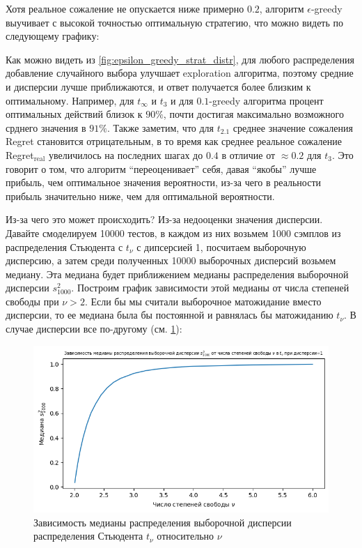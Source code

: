 Хотя реальное сожаление не опускается ниже примерно $0.2$, алгоритм $\epsilon$-greedy выучивает с высокой точностью оптимальную стратегию, что можно видеть по следующему графику: 

Как можно видеть из \ref{fig:epsilon_greedy_strat_distr}, для любого распределения добавление случайного выбора улучшает exploration алгоритма, поэтому средние и дисперсии лучше приближаются, и ответ получается более близким к оптимальному. Например, для $t_{\infty}$ и $t_3$ и для $0.1$-greedy алгоритма процент оптимальных действий близок к $90\%$, почти достигая максимально возможного срднего значения в $91\%$. Также заметим, что для $t_{2.1}$ среднее значение сожаления Regret становится отрицательным, в то время как среднее реальное сожаление Regret$_{{\text{real}}}$ увеличилось на последних шагах до $0.4$ в отличие от $\approx 0.2$ для $t_3$. Это говорит о том, что алгоритм ``переоценивает'' себя, давая ``якобы'' лучше прибыль, чем оптимальное значения вероятности, из-за чего в реальности прибыль значительно ниже, чем для оптимальной вероятности.

Из-за чего это может происходить? Из-за недооценки значения дисперсии. Давайте смоделируем 10000 тестов, в каждом из них возьмем 1000 сэмплов из распределения Стьюдента с $t_{\nu}$ с дипсерсией 1, посчитаем выборочную дисперсию, а затем среди полученных 10000 выборочных дисперсий возьмем медиану. Эта медиана будет приближением медианы распределения выборочной дисперсии $s_{1000}^2$. Построим график зависимости этой медианы от числа степеней свободы при $\nu > 2$. Если бы мы считали выборочное матожидание вместо дисперсии, то ее медиана была бы постоянной и равнялась бы матожиданию $t_{\nu}$. В случае дисперсии все по-другому (см. \ref{fig:median_depend_on_df}):

\begin{figure}[ht!] %
\centering
\includegraphics[width=5in]{theory_tester/theory_images/median_depend_on_df.png}
\caption{Зависимость медианы распределения выборочной дисперсии распределения Стьюдента $t_{\nu}$ относительно $\nu$}
\label{fig:median_depend_on_df}
\end{figure}

